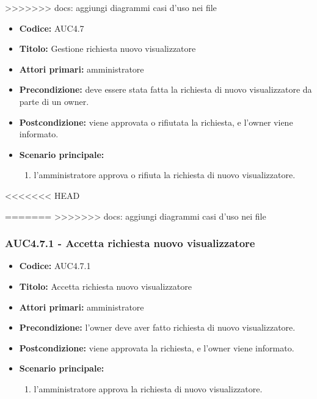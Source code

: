 \documentclass[casi-duso]{subfiles}
\begin{document}
>>>>>>> docs: aggiungi diagrammi casi d'uso nei file
\begin{itemize}
  \item \textbf{Codice:} AUC4.7
  \item \textbf{Titolo:} Gestione richiesta nuovo visualizzatore
  \item \textbf{Attori primari:} amministratore
  \item \textbf{Precondizione:} deve essere stata fatta la richiesta di nuovo visualizzatore da parte di un owner.
  \item \textbf{Postcondizione:} viene approvata o rifiutata la richiesta, e l'owner viene informato.
  \item \textbf{Scenario principale:}
  \begin{enumerate}
    \item l'amministratore approva o rifiuta la richiesta di nuovo visualizzatore.
  \end{enumerate}
\end{itemize}

<<<<<<< HEAD

=======
>>>>>>> docs: aggiungi diagrammi casi d'uso nei file
\subsubsection{AUC4.7.1 - Accetta richiesta nuovo visualizzatore}%
\label{subsub:AUC4.7.1}
\begin{itemize}
  \item \textbf{Codice:} AUC4.7.1
  \item \textbf{Titolo:} Accetta richiesta nuovo visualizzatore
  \item \textbf{Attori primari:} amministratore
  \item \textbf{Precondizione:} l'owner deve aver fatto richiesta di nuovo visualizzatore.
  \item \textbf{Postcondizione:} viene approvata la richiesta, e l'owner viene informato.
  \item \textbf{Scenario principale:}
  \begin{enumerate}
    \item l'amministratore approva la richiesta di nuovo visualizzatore.
  \end{enumerate}
\end{itemize}  
\end{document}
